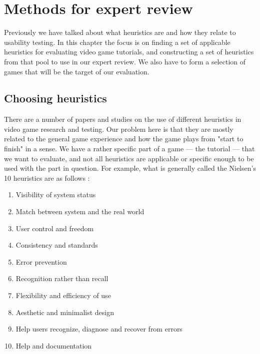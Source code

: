 \chapter{Methods for expert review}
Previously we have talked about what heuristics are and how they relate to usability testing. In this chapter the focus is on finding a set of applicable heuristics for evaluating video game tutorials, and constructing a set of heuristics from that pool to use in our expert review. We also have to form a selection of games that will be the target of our evaluation.

\section{Choosing  heuristics}
There are a number of papers and studies on the use of different heuristics in video game research and testing. Our problem here is that they are mostly related to the general game experience and how the game plays from "start to finish" in a sense. We have a rather specific part of a game --- the tutorial --- that we want to evaluate, and not all heuristics are applicable or specific enough to be used with the part in question. For example, what is generally called the Nielsen's 10 heuristics are as follows \cite{Nielsen1993}: 

\begin{enumerate}
	\item Visibility of system status
	\item Match between system and the real world
	\item User control and freedom
	\item Consistency and standards
	\item Error prevention
	\item Recognition rather than recall
	\item Flexibility and efficiency of use
	\item Aesthetic and minimalist design
	\item Help users recognize, diagnose and recover from errors
	\item Help and documentation
\end{enumerate}


